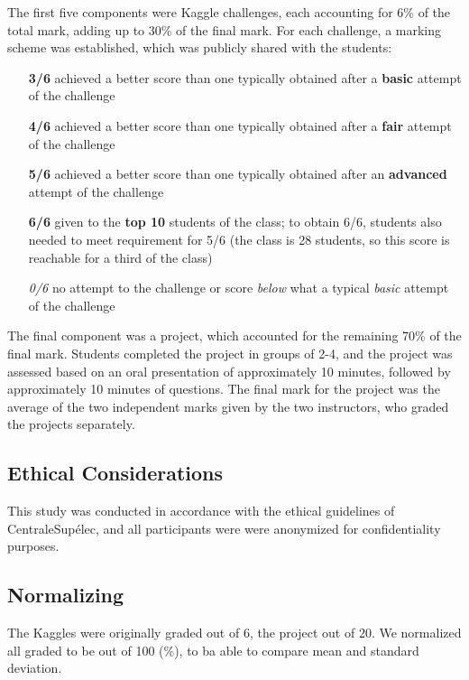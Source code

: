 \documentclass[a4paper]{article}
\begin{document}
The first five components were Kaggle challenges, each accounting for 6\% of the total mark, adding up to 30\% of the final mark.
For each challenge, a marking scheme was established, which was publicly shared with the students:
\begin{itemize}
	\item [\textbf{3/6}] achieved a better score than one typically obtained after a \textbf{basic} attempt of the challenge
	\item [\textbf{4/6}] achieved a better score than one typically obtained after a \textbf{fair} attempt of the challenge
	\item [\textbf{5/6}] achieved a better score than one typically obtained after an \textbf{advanced} attempt of the challenge
	\item [\textbf{6/6}] given to the \textbf{top 10} students of the class; to obtain 6/6, students also needed to meet requirement for 5/6 (the class is 28 students, so this score is reachable for a third of the class)
	\item [\textit{0/6}] no attempt to the challenge or score \textit{below} what a typical \textit{basic} attempt of the challenge
\end{itemize}

The final component was a project, which accounted for the remaining 70\% of the final mark.
Students completed the project in groups of 2-4, and the project was assessed based on an oral presentation of approximately 10 minutes, followed by approximately 10 minutes of questions.
The final mark for the project was the average of the two independent marks given by the two instructors, who graded the projects separately.

\subsection{Ethical Considerations}
This study was conducted in accordance with the ethical guidelines of CentraleSupélec, and all participants were were anonymized for confidentiality purposes.

\subsection{Normalizing}
The Kaggles were originally graded out of 6, the project out of 20.
We normalized all graded to be out of 100 (\%), to ba able to compare mean and standard deviation.
\end{document}
